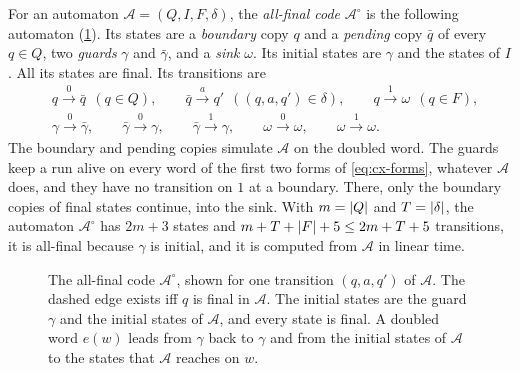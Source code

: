 For an automaton $\mathcal A=(Q,I,F,\delta)$, the \emph{all-final code}
$\mathcal A^\circ$ is the following automaton (\cref{fig:cx-adapter}). Its
states are a \emph{boundary} copy $q$ and a \emph{pending} copy $\bar q$ of
every $q\in Q$, two \emph{guards} $\gamma$ and $\bar\gamma$, and a
\emph{sink} $\omega$. Its initial states are $\gamma$ and the states of $I$.
All its states are final. Its transitions are
\[
\begin{aligned}
 &q\xrightarrow0\bar q\ \ (q\in Q),\qquad
  \bar q\xrightarrow{a}q'\ \ ((q,a,q')\in\delta),\qquad
  q\xrightarrow1\omega\ \ (q\in F),\\
 &\gamma\xrightarrow0\bar\gamma,\qquad
  \bar\gamma\xrightarrow0\gamma,\qquad
  \bar\gamma\xrightarrow1\gamma,\qquad
  \omega\xrightarrow0\omega,\qquad
  \omega\xrightarrow1\omega.
\end{aligned}
\]
The boundary and pending copies simulate $\mathcal A$ on the doubled word.
The guards keep a run alive on every word of the first two forms of
\eqref{eq:cx-forms}, whatever $\mathcal A$ does, and they have no transition
on $1$ at a boundary. There, only the boundary copies of final states
continue, into the sink. With $m=\lvert Q\rvert$ and $T=\lvert \delta\rvert$, the automaton
$\mathcal A^\circ$ has $2m+3$ states and $m+T+\lvert F\rvert+5\le2m+T+5$ transitions,
it is all-final because $\gamma$ is initial, and it is computed from
$\mathcal A$ in linear time.

\begin{figure}[tbp]
\centering
{}
\caption{The all-final code $\mathcal A^\circ$, shown for one transition
$(q,a,q')$ of $\mathcal A$. The dashed edge exists iff $q$ is final in
$\mathcal A$. The initial states are the guard $\gamma$ and the initial
states of $\mathcal A$, and every state is final. A doubled word $e(w)$
leads from $\gamma$ back to $\gamma$ and from the initial states of
$\mathcal A$ to the states that $\mathcal A$ reaches on $w$.}
\label{fig:cx-adapter}
\end{figure}

